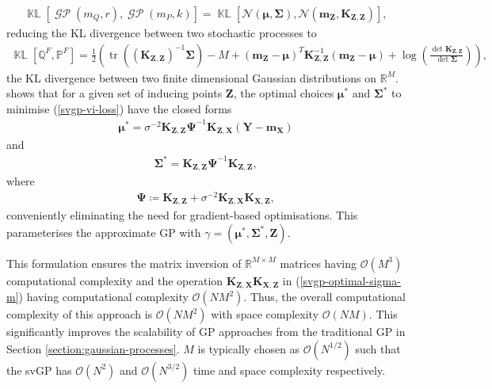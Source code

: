 \documentclass{article}
\newcommand{\KLD}{\operatorname{\mathbb{KL}}}
\newcommand{\tr}{\operatorname{tr}}
\newcommand{\GP}{\operatorname{\mathcal{GP}}}
\numberwithin{equation}{section}
\begin{document}
\begin{align}
    \KLD\left[\GP\left(m_Q, r\right), \GP\left(m_P, k\right)\right] = \KLD\left[\mathcal{N}\left(\boldsymbol{\mu}, \mathbf{\Sigma}\right), \mathcal{N}\left(\mathbf{m}_{\mathbf{Z}}, \mathbf{K}_{\mathbf{Z}, \mathbf{Z}}\right)\right],
\end{align}
reducing the KL divergence between two stochastic processes to 
\begin{align}
        \KLD\left[\mathbb{Q}^F, \mathbb{P}^F\right]
    = \frac{1}{2}\left( \tr\left(\left(\mathbf{K}_{\mathbf{Z}, \mathbf{Z}}\right)^{-1} \boldsymbol{\Sigma}\right) - M +
    \left(\mathbf{m}_{\mathbf{Z}} - \boldsymbol{\mu}\right)^T \mathbf{K}_{\mathbf{Z}, \mathbf{Z}}^{-1} \left(\mathbf{m}_{\mathbf{Z}} - \boldsymbol{\mu}\right)+ \log\left(\frac{\det\mathbf{K}_{\mathbf{Z}, \mathbf{Z}}}{\det\boldsymbol{\Sigma}}\right) \right),
    \label{kld-closed-form}
\end{align}
the KL divergence between two finite dimensional Gaussian distributions on $\mathbb{R}^M$.
\cite{titsias2009variational} shows that for a given set of inducing points $\mathbf{Z}$, the optimal choices $\boldsymbol{\mu}^*$ and $\mathbf{\Sigma}^*$ to minimise (\ref{svgp-vi-loss}) have the closed forms
\begin{align}
    \label{svgp-optimal-mean}
    \boldsymbol{\mu}^* = \sigma^{-2}\mathbf{K}_{\mathbf{Z}, \mathbf{Z}} \mathbf{\Psi}^{-1}\mathbf{K}_{\mathbf{Z}, \mathbf{X}}  \left(\mathbf{Y} - \mathbf{m}_\mathbf{X}\right)
\end{align}
and
\begin{align}
    \label{svgp-optimal-covariance}
    \mathbf{\Sigma}^* = \mathbf{K}_{\mathbf{Z}, \mathbf{Z}}  \mathbf{\Psi}^{-1}\mathbf{K}_{\mathbf{Z}, \mathbf{Z}},
\end{align}
where 
\begin{align}
    \mathbf{\Psi} \coloneqq \mathbf{K}_{\mathbf{Z}, \mathbf{Z}}  + \sigma^{-2}\mathbf{K}_{\mathbf{Z}, \mathbf{X}} \mathbf{K}_{\mathbf{X}, \mathbf{Z}},
    \label{svgp-optimal-sigma-m}
\end{align}
conveniently eliminating the need for gradient-based optimisations. 
This parameterises the approximate GP with $\gamma = \left(\boldsymbol{\mu}^*, \mathbf{\Sigma}^*,  \mathbf{Z}\right)$.

This formulation ensures the matrix inversion of $\mathbb{R}^{M \times M}$ matrices having $\mathcal{O}\left(M^3\right)$ computational complexity and the operation $\mathbf{K}_{\mathbf{Z}, \mathbf{X}} \mathbf{K}_{\mathbf{X}, \mathbf{Z}}$ in (\ref{svgp-optimal-sigma-m}) having computational complexity $\mathcal{O}\left(NM^2\right)$. 
Thus, the overall computational complexity of this approach is $\mathcal{O}\left(NM^2\right)$ with space complexity $\mathcal{O}\left(NM\right)$. 
This significantly improves the scalability of GP approaches from the traditional GP in Section \ref{section:gaussian-processes}. $M$ is typically chosen as $\mathcal{O}(N^{1/2})$ such that the svGP has $\mathcal{O}(N^{2})$ and $\mathcal{O}(N^{3/2})$ time and space complexity respectively.
\end{document}

